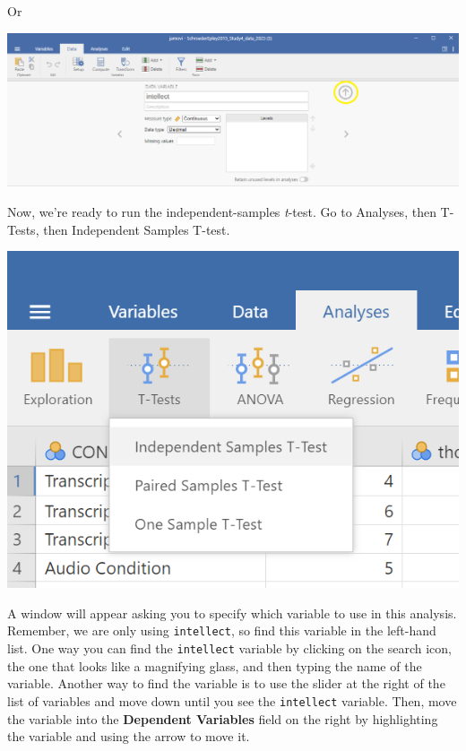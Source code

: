 \documentclass[
]{book}
\begin{document}
Or

\includegraphics{img/ClosingVariableAttributesWindow2.png}

Now, we're ready to run the independent-samples \emph{t}-test. Go to {Analyses}, then {T-Tests}, then {Independent Samples T-test}.

\includegraphics{img/IndependentTTestCommands.png}

A window will appear asking you to specify which variable to use in this analysis. Remember, we are only using \texttt{intellect}, so find this variable in the left-hand list. One way you can find the \texttt{intellect} variable by clicking on the search icon, the one that looks like a magnifying glass, and then typing the name of the variable. Another way to find the variable is to use the slider at the right of the list of variables and move down until you see the \texttt{intellect} variable. Then, move the variable into the \textbf{Dependent Variables} field on the right by highlighting the variable and using the arrow to move it.
\end{document}
